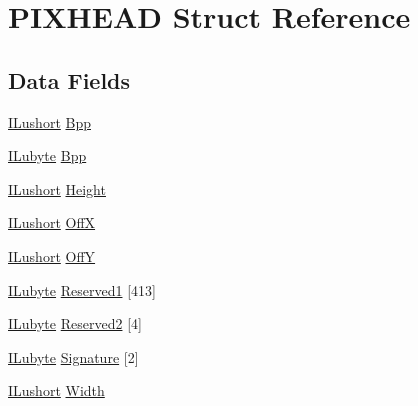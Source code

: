 \hypertarget{struct_p_i_x_h_e_a_d}{\section{P\-I\-X\-H\-E\-A\-D Struct Reference}
\label{struct_p_i_x_h_e_a_d}
}
\subsection*{Data Fields}
\begin{DoxyCompactItemize}
\item 
\hyperlink{il_8h_af6287b43748354a7c4864da43ae56962}{I\-Lushort} \hyperlink{struct_p_i_x_h_e_a_d_ab728f0f2cfab1768414a4947d92d2dae}{Bpp}
\item 
\hyperlink{il_8h_a8d2f04500100a86d1b00e98ab1b15a33}{I\-Lubyte} \hyperlink{struct_p_i_x_h_e_a_d_acb619433784a0e26c0f1f18b3700c9f7}{Bpp}
\item 
\hyperlink{il_8h_af6287b43748354a7c4864da43ae56962}{I\-Lushort} \hyperlink{struct_p_i_x_h_e_a_d_ab74e2bb7cc7272180be796817440ae4e}{Height}
\item 
\hyperlink{il_8h_af6287b43748354a7c4864da43ae56962}{I\-Lushort} \hyperlink{struct_p_i_x_h_e_a_d_a3f9a22bde789f29ef4ad58814114c2cd}{Off\-X}
\item 
\hyperlink{il_8h_af6287b43748354a7c4864da43ae56962}{I\-Lushort} \hyperlink{struct_p_i_x_h_e_a_d_a773596faf6de594cfb1e6ba27ff01dd3}{Off\-Y}
\item 
\hyperlink{il_8h_a8d2f04500100a86d1b00e98ab1b15a33}{I\-Lubyte} \hyperlink{struct_p_i_x_h_e_a_d_acadb44810d3d0ff65dc9452ca84693c9}{Reserved1} \mbox{[}413\mbox{]}
\item 
\hyperlink{il_8h_a8d2f04500100a86d1b00e98ab1b15a33}{I\-Lubyte} \hyperlink{struct_p_i_x_h_e_a_d_a3e70979be1ffec78a081e0b473ab2007}{Reserved2} \mbox{[}4\mbox{]}
\item 
\hyperlink{il_8h_a8d2f04500100a86d1b00e98ab1b15a33}{I\-Lubyte} \hyperlink{struct_p_i_x_h_e_a_d_a6ec4a80be3b5d31ee76128ca1a9c7fa6}{Signature} \mbox{[}2\mbox{]}
\item 
\hyperlink{il_8h_af6287b43748354a7c4864da43ae56962}{I\-Lushort} \hyperlink{struct_p_i_x_h_e_a_d_aed0f0a923b8346ba51a4de45fff77ee7}{Width}
\end{DoxyCompactItemize}


